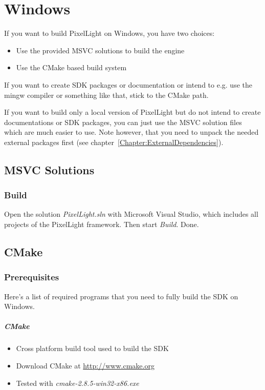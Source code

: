 \chapter{Windows}
If you want to build PixelLight on Windows, you have two choices:
\begin{itemize}
\item{Use the provided \ac{MSVC} solutions to build the engine}
\item{Use the CMake based build system}
\end{itemize}

If you want to create \ac{SDK} packages or documentation or intend to e.g. use the mingw compiler or something like that, stick to the CMake path.

If you want to build only a local version of PixelLight but do not intend to create documentations or \ac{SDK} packages, you can just use the \ac{MSVC} solution files which are much easier to use. Note however, that you need to unpack the needed external packages first (see chapter~\ref{Chapter:ExternalDependencies}).





\section{\ac{MSVC} Solutions}



\subsection{Build}
Open the solution \emph{PixelLight.sln} with Microsoft Visual Studio, which includes all projects of the PixelLight framework. Then start \emph{Build}. Done.




\section{CMake}



\subsection{Prerequisites}
Here's a list of required programs that you need to fully build the \ac{SDK} on Windows.


\paragraph{CMake}
\begin{itemize}
\item{Cross platform build tool used to build the \ac{SDK}}
\item{Download CMake at \url{http://www.cmake.org}}
\item{Tested with \emph{cmake-2.8.5-win32-x86.exe}}
\end{itemize}


